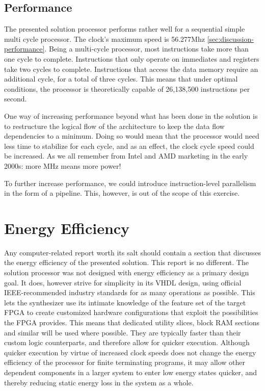 \subsection{Performance}

The presented solution processor performs rather well for a sequential simple multi cycle processor.
The clock's maximum speed is 56.277Mhz \vref{sec:discussion-performance}.
Being a multi-cycle processor, most instructions take more than one cycle to complete.
Instructions that only operate on immediates and registers take two cycles to complete.
Instructions that access the data memory require an additional cycle, for a total of three cycles.
This means that under optimal conditions, the processor is theoretically capable of 26,138,500 instructions per second.

One way of increasing performance beyond what has been done in the solution is to restructure the logical flow of the architecture to keep the data flow dependencies to a minimum.
Doing so would mean that the processor would need less time to stabilize for each cycle, and as an effect, the clock cycle speed could be increased.
As we all remember from Intel and AMD marketing in the early 2000s: more MHz means more power!

To further increase performance, we could introduce instruction-level parallelism in the form of a pipeline.
This, however, is out of the scope of this exercise.

\section{Energy Efficiency}

Any computer-related report worth its salt should contain a section that discusses the energy efficiency of the presented solution.
This report is no different.
The solution processor was not designed with energy efficiency as a primary design goal.
It does, however strive for simplicity in its VHDL design, using official IEEE-recommended industry standards for as many operations as possible.
This lets the synthesizer use its intimate knowledge of the feature set of the target FPGA to create customized hardware configurations that exploit the possibilities the FPGA provides.
This means that dedicated utility slices, block RAM sections and similar will be used where possible.
They are typically faster than their custom logic counterparts, and therefore allow for quicker execution.
Although quicker execution by virtue of increased clock speeds does not change the energy efficiency of the processor for finite terminating programs, it may allow other dependent components in a larger system to enter low energy states quicker, and thereby reducing static energy loss in the system as a whole.

